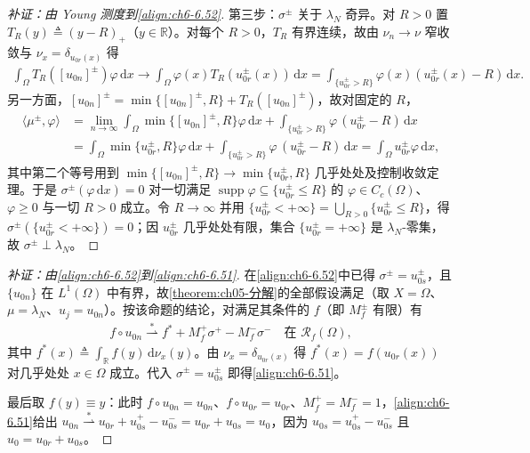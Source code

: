\documentclass[../../main.tex]{subfiles}%
\begin{document}
\begin{proof}[补证：由 Young 测度到\eqref{align:ch6-6.52}]
第三步：$\sigma^\pm$ 关于 $\lambda_N$ 奇异。对 $R>0$ 置 $T_R(y)\triangleq(y-R)_+$（$y\in\mathbb{R}$）。对每个 $R>0$，$T_R$ 有界连续，故由 $\nu_n\to\nu$ 窄收敛与 $\nu_x=\delta_{u_{0r}(x)}$ 得
\begin{align*}
\int_\Omega T_R([u_{0n}]^\pm)\varphi\,\mathrm{d}x
\to\int_\Omega\varphi(x)T_R(u^\pm_{0r}(x))\,\mathrm{d}x
=\int_{\{u^\pm_{0r}>R\}}\varphi(x)(u^\pm_{0r}(x)-R)\,\mathrm{d}x.
\end{align*}
另一方面，$[u_{0n}]^\pm=\min\{[u_{0n}]^\pm,R\}+T_R([u_{0n}]^\pm)$，故对固定的 $R$，
\begin{align*}
\langle\mu^\pm,\varphi\rangle
&=\lim_{n\to\infty}\int_\Omega\min\{[u_{0n}]^\pm,R\}\varphi\,\mathrm{d}x
+\int_{\{u^\pm_{0r}>R\}}\varphi\,(u^\pm_{0r}-R)\,\mathrm{d}x\\
&=\int_\Omega\min\{u^\pm_{0r},R\}\varphi\,\mathrm{d}x
+\int_{\{u^\pm_{0r}>R\}}\varphi\,(u^\pm_{0r}-R)\,\mathrm{d}x
=\int_\Omega u^\pm_{0r}\varphi\,\mathrm{d}x,
\end{align*}
其中第二个等号用到 $\min\{[u_{0n}]^\pm,R\}\to\min\{u^\pm_{0r},R\}$ 几乎处处及控制收敛定理。于是 $\sigma^\pm(\varphi\,\mathrm{d}x)=0$ 对一切满足 $\operatorname{supp}\varphi\subseteq\{u^\pm_{0r}\leqslant R\}$ 的 $\varphi\in C_c(\Omega)$、$\varphi\geqslant0$ 与一切 $R>0$ 成立。令 $R\to\infty$ 并用 $\{u^\pm_{0r}<+\infty\}=\bigcup_{R>0}\{u^\pm_{0r}\leqslant R\}$，得 $\sigma^\pm(\{u^\pm_{0r}<+\infty\})=0$；因 $u^\pm_{0r}$ 几乎处处有限，集合 $\{u^\pm_{0r}=+\infty\}$ 是 $\lambda_N$-零集，故 $\sigma^\pm\perp\lambda_N$。
\end{proof}

\begin{proof}[补证：由\eqref{align:ch6-6.52}到\eqref{align:ch6-6.51}]
在\eqref{align:ch6-6.52}中已得 $\sigma^\pm=u^\pm_{0s}$，且 $\{u_{0n}\}$ 在 $L^1(\Omega)$ 中有界，故\cref{theorem:ch05-分解}的全部假设满足（取 $X=\Omega$、$\mu=\lambda_N$、$u_j=u_{0n}$）。按该命题的结论，对满足其条件的 $f$（即 $M^\pm_f$ 有限）有
\begin{align*}
f\circ u_{0n}\stackrel{*}{\rightharpoonup}f^*+M^+_f\sigma^+-M^-_f\sigma^-
\quad\text{在 }\mathscr{R}_f(\Omega),
\end{align*}
其中 $f^*(x)\triangleq\int_\mathbb{R}f(y)\,\mathrm{d}\nu_x(y)$。由 $\nu_x=\delta_{u_{0r}(x)}$ 得 $f^*(x)=f(u_{0r}(x))$ 对几乎处处 $x\in\Omega$ 成立。代入 $\sigma^\pm=u^\pm_{0s}$ 即得\eqref{align:ch6-6.51}。

最后取 $f(y)\equiv y$：此时 $f\circ u_{0n}=u_{0n}$、$f\circ u_{0r}=u_{0r}$、$M^+_f=M^-_f=1$，\eqref{align:ch6-6.51}给出 $u_{0n}\stackrel{*}{\rightharpoonup}u_{0r}+u^+_{0s}-u^-_{0s}=u_{0r}+u_{0s}=u_0$，因为 $u_{0s}=u^+_{0s}-u^-_{0s}$ 且 $u_0=u_{0r}+u_{0s}$。
\end{proof}
\end{document}
